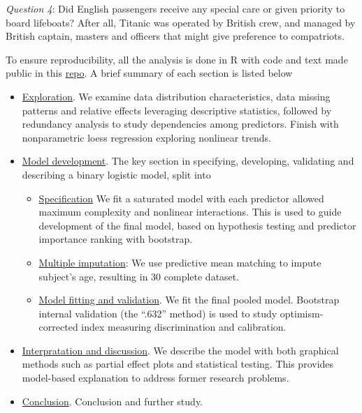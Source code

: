 \documentclass[]{interact}
\theoremstyle{plain}%
\theoremstyle{definition}
\theoremstyle{remark}
\begin{document}
\emph{Question 4}: Did English passengers receive any special care or given priority to board lifeboats? After all, Titanic was operated by British crew, and managed by British captain, masters and officers that might give preference to compatriots.

To ensure reproducibility, all the analysis is done in R \citep{base} with code and text made public in this \href{https://github.com/enixam/titanic-survival}{repo}. A brief summary of each section is listed below

\begin{itemize}
\item
  \protect\hyperlink{exploration}{Exploration}. We examine data distribution characteristics, data missing patterns and relative effects leveraging descriptive statistics, followed by redundancy analysis to study dependencies among predictors. Finish with nonparametric loess regression exploring nonlinear trends.
\item
  \protect\hyperlink{dev}{Model development}. The key section in specifying, developing, validating and describing a binary logistic model, split into

  \begin{itemize}
  \item
    \protect\hyperlink{spec}{Specification} We fit a saturated model with each predictor allowed maximum complexity and nonlinear interactions. This is used to guide development of the final model, based on hypothesis testing and predictor importance ranking with bootstrap.
  \item
    \protect\hyperlink{imputation}{Multiple imputation}: We use predictive mean matching to impute subject's age, resulting in 30 complete dataset.
  \item
    \protect\hyperlink{fit}{Model fitting and validation}. We fit the final pooled model. Bootstrap internal validation (the ``.632'' method) is used to study optimism-corrected index measuring discrimination and calibration.
  \end{itemize}
\item
  \protect\hyperlink{interpretation}{Interpratation and discussion}. We describe the model with both graphical methods such as partial effect plots and statistical testing. This provides model-based explanation to address former research problems.
\item
  \protect\hyperlink{conclusion}{Conclusion}. Conclusion and further study.
\end{itemize}
\end{document}
